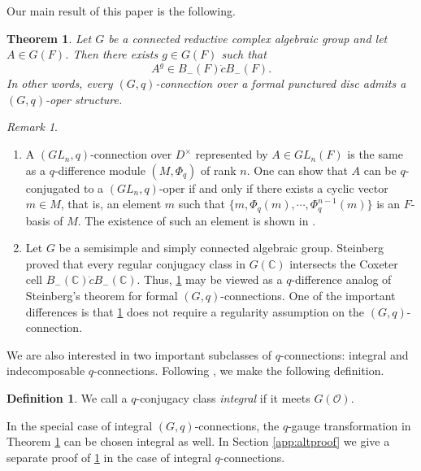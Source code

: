 \documentclass[11pt]{amsart}
\numberwithin{equation}{section}
\newtheorem{theorem}{Theorem}[section]
\theoremstyle{definition}
\newtheorem{definition}[definition]{Definition}
\theoremstyle{remark}
\newtheorem{remark}[remark]{Remark}
\begin{document}
Our main result of this paper is the following.
\begin{theorem}\label{thm:main-intro}
Let $G$ be a connected reductive complex algebraic group and let
$A\in G(F)$. Then there exists $g\in G(F)$ such that
\[
  A^g\in B_-(F)\dot cB_-(F).
\]
In other words, every $(G,q)$-connection over a formal punctured disc admits a $(G,q)$-oper structure.
\end{theorem}
\begin{remark}
\begin{enumerate}
\item A $(GL_n,q)$-connection over $D^{\times}$ represented by $A\in GL_{n}(F)$ is the same as a $q$-difference module \cite[Definition 1.1.5]{DV} $(M,\Phi_q)$ of rank $n$. One can show that $A$ can be $q$-conjugated to a $(GL_n,q)$-oper if and only if there exists a cyclic vector $m\in M$, that is, an element $m$ such that $\{m,\Phi_{q}(m),\cdots,\Phi_{q}^{n-1}(m)\}$ is an $F$-basis of $M$. The existence of such an element is shown in \cite[Lemma 1.3.1]{DV}. 

\item Let $G$ be a semisimple and simply connected algebraic group. Steinberg proved \cite[Theorem 1.4]{St} that every regular conjugacy class in $G(\mathbb{C})$ intersects the Coxeter cell $B_{-}(\mathbb{C})\dot{c}B_{-}(\mathbb{C})$.
Thus, \cref{thm:main-intro} may be viewed as a $q$-difference analog of Steinberg's theorem for formal $(G,q)$-connections. One of the important differences is that \cref{thm:main-intro} does not require a regularity assumption on the $(G,q)$-connection.
\end{enumerate}
\end{remark}
We are also interested in two important subclasses of $q$-connections: integral and indecomposable $q$-connections. Following \cite{BG}, we make the following definition.
\begin{definition}
    We call a $q$-conjugacy class \emph{integral} if it meets $G(\mathcal O)$.
\end{definition}
In the special case of integral $(G,q)$-connections, the $q$-gauge transformation in Theorem \ref{thm:main-intro} can be chosen integral as well. In Section \ref{app:altproof} we give a separate proof of \cref{thm:main-intro} in the case of integral $q$-connections.
\end{document}
